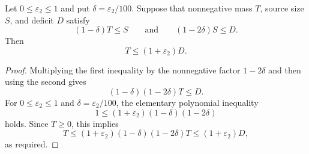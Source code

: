 \begin{helper}
Let \(0\le\varepsilon_2\le1\) and put \(\delta=\varepsilon_2/100\).  Suppose
that nonnegative mass \(T\), source size \(S\), and deficit \(D\) satisfy
\[
(1-\delta)T\le S
\qquad\text{and}\qquad
(1-2\delta)S\le D.
\]
Then
\[
T\le (1+\varepsilon_2)D.
\]
\end{helper}
\begin{proof}
Multiplying the first inequality by the nonnegative factor \(1-2\delta\) and
then using the second gives
\[
(1-\delta)(1-2\delta)T\le D.
\]
For \(0\le\varepsilon_2\le1\) and \(\delta=\varepsilon_2/100\), the elementary
polynomial inequality
\[
1\le (1+\varepsilon_2)(1-\delta)(1-2\delta)
\]
holds.  Since \(T\ge0\), this implies
\[
T\le (1+\varepsilon_2)(1-\delta)(1-2\delta)T
\le (1+\varepsilon_2)D,
\]
as required.
\end{proof}
